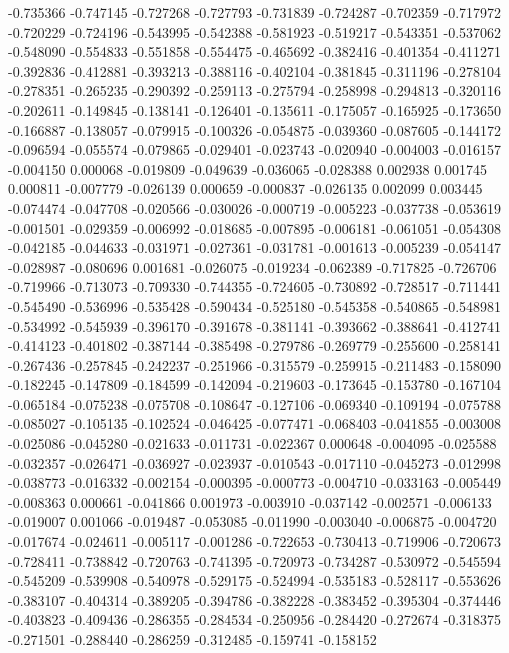 -0.735366
-0.747145
-0.727268
-0.727793
-0.731839
-0.724287
-0.702359
-0.717972
-0.720229
-0.724196
-0.543995
-0.542388
-0.581923
-0.519217
-0.543351
-0.537062
-0.548090
-0.554833
-0.551858
-0.554475
-0.465692
-0.382416
-0.401354
-0.411271
-0.392836
-0.412881
-0.393213
-0.388116
-0.402104
-0.381845
-0.311196
-0.278104
-0.278351
-0.265235
-0.290392
-0.259113
-0.275794
-0.258998
-0.294813
-0.320116
-0.202611
-0.149845
-0.138141
-0.126401
-0.135611
-0.175057
-0.165925
-0.173650
-0.166887
-0.138057
-0.079915
-0.100326
-0.054875
-0.039360
-0.087605
-0.144172
-0.096594
-0.055574
-0.079865
-0.029401
-0.023743
-0.020940
-0.004003
-0.016157
-0.004150
0.000068
-0.019809
-0.049639
-0.036065
-0.028388
0.002938
0.001745
0.000811
-0.007779
-0.026139
0.000659
-0.000837
-0.026135
0.002099
0.003445
-0.074474
-0.047708
-0.020566
-0.030026
-0.000719
-0.005223
-0.037738
-0.053619
-0.001501
-0.029359
-0.006992
-0.018685
-0.007895
-0.006181
-0.061051
-0.054308
-0.042185
-0.044633
-0.031971
-0.027361
-0.031781
-0.001613
-0.005239
-0.054147
-0.028987
-0.080696
0.001681
-0.026075
-0.019234
-0.062389
-0.717825
-0.726706
-0.719966
-0.713073
-0.709330
-0.744355
-0.724605
-0.730892
-0.728517
-0.711441
-0.545490
-0.536996
-0.535428
-0.590434
-0.525180
-0.545358
-0.540865
-0.548981
-0.534992
-0.545939
-0.396170
-0.391678
-0.381141
-0.393662
-0.388641
-0.412741
-0.414123
-0.401802
-0.387144
-0.385498
-0.279786
-0.269779
-0.255600
-0.258141
-0.267436
-0.257845
-0.242237
-0.251966
-0.315579
-0.259915
-0.211483
-0.158090
-0.182245
-0.147809
-0.184599
-0.142094
-0.219603
-0.173645
-0.153780
-0.167104
-0.065184
-0.075238
-0.075708
-0.108647
-0.127106
-0.069340
-0.109194
-0.075788
-0.085027
-0.105135
-0.102524
-0.046425
-0.077471
-0.068403
-0.041855
-0.003008
-0.025086
-0.045280
-0.021633
-0.011731
-0.022367
0.000648
-0.004095
-0.025588
-0.032357
-0.026471
-0.036927
-0.023937
-0.010543
-0.017110
-0.045273
-0.012998
-0.038773
-0.016332
-0.002154
-0.000395
-0.000773
-0.004710
-0.033163
-0.005449
-0.008363
0.000661
-0.041866
0.001973
-0.003910
-0.037142
-0.002571
-0.006133
-0.019007
0.001066
-0.019487
-0.053085
-0.011990
-0.003040
-0.006875
-0.004720
-0.017674
-0.024611
-0.005117
-0.001286
-0.722653
-0.730413
-0.719906
-0.720673
-0.728411
-0.738842
-0.720763
-0.741395
-0.720973
-0.734287
-0.530972
-0.545594
-0.545209
-0.539908
-0.540978
-0.529175
-0.524994
-0.535183
-0.528117
-0.553626
-0.383107
-0.404314
-0.389205
-0.394786
-0.382228
-0.383452
-0.395304
-0.374446
-0.403823
-0.409436
-0.286355
-0.284534
-0.250956
-0.284420
-0.272674
-0.318375
-0.271501
-0.288440
-0.286259
-0.312485
-0.159741
-0.158152
